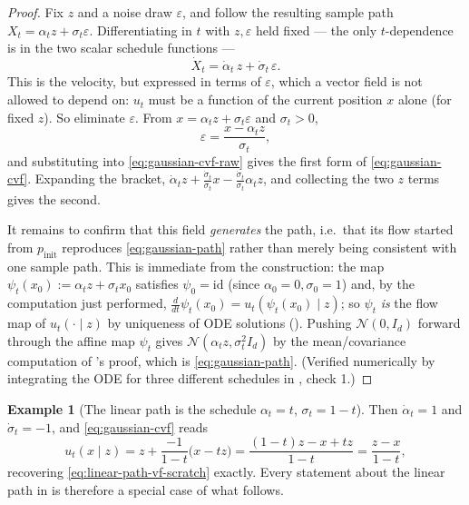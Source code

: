 \documentclass[11pt,a4paper]{report}
\theoremstyle{definition}
\newtheorem{example}[example]{Example}
\theoremstyle{remark}
\begin{document}
\begin{proof}
Fix $z$ and a noise draw $\varepsilon$, and follow the resulting sample
path $X_t = \alpha_tz+\sigma_t\varepsilon$. Differentiating in $t$ with
$z,\varepsilon$ held fixed --- the only $t$-dependence is in the two scalar
schedule functions ---
\begin{equation}
\label{eq:gaussian-cvf-raw}
\dot X_t = \dot\alpha_t\,z + \dot\sigma_t\,\varepsilon .
\end{equation}
This is the velocity, but expressed in terms of $\varepsilon$, which a
vector field is not allowed to depend on: $u_t$ must be a function of the
current position $x$ alone (for fixed $z$). So eliminate $\varepsilon$. From
$x = \alpha_tz+\sigma_t\varepsilon$ and $\sigma_t>0$,
\begin{equation}
\label{eq:eps-from-x}
\varepsilon = \frac{x-\alpha_tz}{\sigma_t} ,
\end{equation}
and substituting into \eqref{eq:gaussian-cvf-raw} gives the first form of
\eqref{eq:gaussian-cvf}. Expanding the bracket,
$\dot\alpha_tz + \frac{\dot\sigma_t}{\sigma_t}x - \frac{\dot\sigma_t}{\sigma_t}\alpha_tz$,
and collecting the two $z$ terms gives the second.

It remains to confirm that this field \emph{generates} the path, i.e.\ that
its flow started from $p_{\mathrm{init}}$ reproduces
\eqref{eq:gaussian-path} rather than merely being consistent with one
sample path. This is immediate from the construction: the map
$\psi_t(x_0) := \alpha_tz+\sigma_tx_0$ satisfies $\psi_0=\mathrm{id}$
(since $\alpha_0=0,\sigma_0=1$) and, by the computation just performed,
$\frac{d}{dt}\psi_t(x_0) = u_t(\psi_t(x_0)\mid z)$; so $\psi_t$ \emph{is}
the flow map of $u_t(\cdot\mid z)$ by uniqueness of ODE solutions
(). Pushing $\mathcal N(0,I_d)$ forward through
the affine map $\psi_t$ gives $\mathcal N(\alpha_tz,\sigma_t^2I_d)$ by the
mean/covariance computation of 's proof,
which is \eqref{eq:gaussian-path}. (Verified numerically by integrating the
ODE for three different schedules in , check 1.)
\end{proof}

\begin{example}[The linear path is the schedule $\alpha_t=t$, $\sigma_t=1-t$]
\label{ex:condot-as-gaussian}
Then $\dot\alpha_t=1$ and $\dot\sigma_t=-1$, and \eqref{eq:gaussian-cvf}
reads
\[
u_t(x\mid z) = z + \frac{-1}{1-t}\bigl(x-tz\bigr)
= \frac{(1-t)z - x + tz}{1-t}
= \frac{z-x}{1-t},
\]
recovering \eqref{eq:linear-path-vf-scratch} exactly. Every statement about
the linear path in  is
therefore a special case of what follows.
\end{example}
\end{document}
